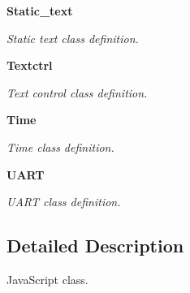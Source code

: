 \begin{DoxyCompactItemize}
\textbf{ Static\+\_\+text}
\begin{DoxyCompactList}\small\item\em Static text class definition. \end{DoxyCompactList}\item 
\textbf{ Textctrl}
\begin{DoxyCompactList}\small\item\em Text control class definition. \end{DoxyCompactList}\item 
\textbf{ Time}
\begin{DoxyCompactList}\small\item\em Time class definition. \end{DoxyCompactList}\item 
\textbf{ U\+A\+RT}
\begin{DoxyCompactList}\small\item\em U\+A\+RT class definition. \end{DoxyCompactList}\end{DoxyCompactItemize}


\subsection{Detailed Description}
Java\+Script class. 


